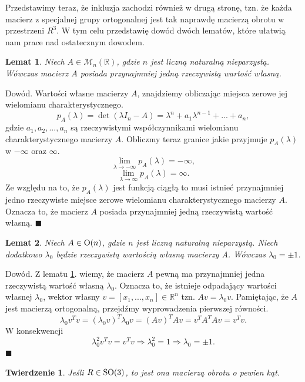 \documentclass[a4paper,twoside,11pt,reqno]{mwrep}
\theoremstyle{plain} \newtheorem{twr}{Twierdzenie}
\theoremstyle{plain} \newtheorem{lem}{Lemat}
\theoremstyle{definition} \newtheorem{defi}{Definicja}
\theoremstyle{remark} \newtheorem*{wni}{Wniosek}
\theoremstyle{definition} \newtheorem{uwaga}{Uwaga}
\theoremstyle{definition}\newtheorem{prz}{Przykład}
\newenvironment{dowod}{\par\vspace{0.1cm}\par{\sc Dowód.}}{\hfill $\blacksquare$\par\vspace{0.4cm}\par}
\begin{document}
Przedstawimy teraz, że inkluzja zachodzi również w drugą stronę, tzn. że każda macierz 
z specjalnej grupy ortogonalnej jest tak naprawdę macierzą obrotu w przestrzeni $R^3$. 
W tym celu przedstawię dowód dwóch lematów, które ułatwią nam prace nad ostatecznym dowodem.
\begin{lem}\label{lematDolematuSO3}
Niech $A\in\mathcal{M}_n(\mathbb{R})$, gdzie $n$ jest liczną naturalną nieparzystą.
Wówczas macierz $A$ posiada przynajmniej jedną rzeczywistą wartość własną.
\end{lem}
\begin{dowod}
Wartości własne macierzy $A$, znajdziemy obliczając miejsca zerowe jej wielomianu charakterystycznego.
$$p_A(\lambda) = \det(\lambda I_n-A) = \lambda^n + a_1\lambda^{n-1}+...+a_n,$$
gdzie $a_1,a_2,...,a_n$ są rzeczywistymi współczynnikami wielomianu charakterystycznego macierzy $A$.
Obliczmy teraz granice jakie przyjmuje $p_A(\lambda)$ w $-\infty$ oraz $\infty$.
$$\lim\limits_{\lambda\rightarrow -\infty} p_A(\lambda) = -\infty,$$
$$\lim\limits_{\lambda\rightarrow \infty} p_A(\lambda) =  \infty.$$
Ze względu na to, że $p_A(\lambda)$ jest funkcją ciągłą 
to musi istnieć przynajmniej jedno rzeczywiste miejsce
zerowe wielomianu charakterystycznego macierzy $A$. 
Oznacza to, że macierz $A$ posiada przynajmniej jedną rzeczywistą wartość własną.
\end{dowod}
\begin{lem}\label{lematDolematuSO3_2}
Niech $A\in\textup{O}(n)$, gdzie $n$ jest liczną naturalną nieparzystą. Niech dodatkowo
$\lambda_0$ będzie rzeczywistą wartością własną macierzy A. Wówczas $\lambda_0 = \pm 1$.
\end{lem}
\begin{dowod}
Z lematu \ref{lematDolematuSO3}. wiemy, że macierz $A$ pewną ma przynajmniej jedna rzeczywistą wartość
własną $\lambda_0$. Oznacza to, że istnieje odpadający wartości własnej $\lambda_0$, wektor własny
$v=[x_1,...,x_n]\in\mathbb{R}^n$ tzn. $Av=\lambda_0 v$. 
Pamiętając, że $A$ jest macierzą ortogonalną, przejdźmy wyprowadzenia pierwszej równości.
$$\lambda_0v^Tv = (\lambda_0 v)^T\lambda_0 v=(Av)^T Av = v^T A^T Av = v^T v .$$
W konsekwencji
$$\lambda_0^2v^Tv = v^T v\Rightarrow\lambda_0^2 = 1\Rightarrow \lambda_0 = \pm 1.$$
\end{dowod}
\begin{twr}
Jeśli $R\in\textup{SO}(3)$, to jest ona macierzą obrotu o pewien kąt.
\end{twr}
\end{document}
